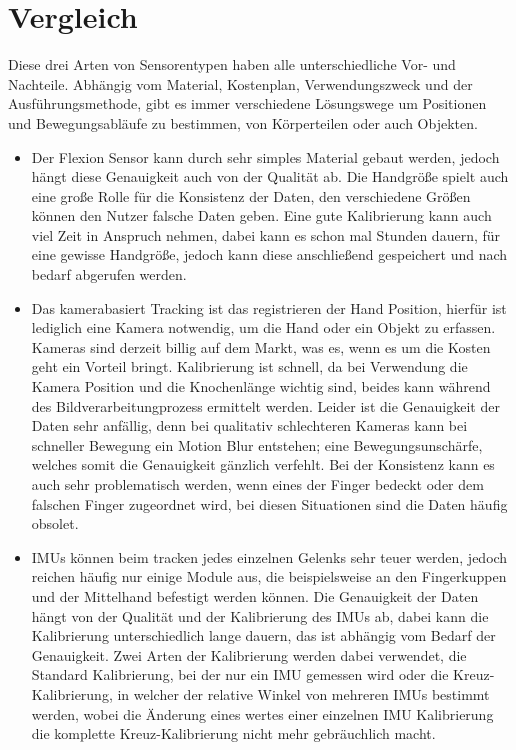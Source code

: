 \section{Vergleich}
Diese drei Arten von Sensorentypen haben alle unterschiedliche Vor- und Nachteile. 
Abhängig vom Material, Kostenplan, Verwendungszweck und der Ausführungsmethode, gibt es immer verschiedene Lösungswege um Positionen und Bewegungsabläufe zu bestimmen, von Körperteilen oder auch Objekten.
\begin{itemize}
    \item Der Flexion Sensor kann durch sehr simples Material gebaut werden, jedoch hängt diese Genauigkeit auch von der Qualität ab. Die Handgröße spielt auch eine große Rolle für die Konsistenz der Daten, den verschiedene Größen können den Nutzer falsche Daten geben. Eine gute Kalibrierung kann auch viel Zeit in Anspruch nehmen, dabei kann es schon mal Stunden dauern, für eine gewisse Handgröße, jedoch kann diese anschließend gespeichert und nach bedarf abgerufen werden.
    
    \item Das kamerabasiert Tracking ist das registrieren der Hand Position, hierfür ist lediglich eine Kamera notwendig, um die Hand oder ein Objekt zu erfassen. Kameras sind derzeit billig auf dem Markt, was es, wenn es um die Kosten geht ein Vorteil bringt. Kalibrierung ist schnell, da bei Verwendung die Kamera Position und die Knochenlänge wichtig sind, beides kann während des Bildverarbeitungprozess ermittelt werden. Leider ist die Genauigkeit der Daten sehr anfällig, denn bei qualitativ schlechteren Kameras kann bei schneller Bewegung ein Motion Blur entstehen; eine Bewegungsunschärfe, welches somit die Genauigkeit gänzlich verfehlt. Bei der Konsistenz kann es auch sehr problematisch werden, wenn eines der Finger bedeckt oder dem falschen Finger zugeordnet wird, bei diesen Situationen sind die Daten häufig obsolet.
    
    \item IMUs können beim tracken jedes einzelnen Gelenks sehr teuer werden, jedoch reichen häufig nur einige Module aus, die beispielsweise an den Fingerkuppen und der Mittelhand befestigt werden können. Die Genauigkeit der Daten hängt von der Qualität und der Kalibrierung des IMUs ab, dabei kann die Kalibrierung unterschiedlich lange dauern, das ist abhängig vom Bedarf der Genauigkeit. Zwei Arten der Kalibrierung werden dabei verwendet, die Standard Kalibrierung, bei der nur ein IMU gemessen wird oder die Kreuz-Kalibrierung, in welcher der relative Winkel von mehreren IMUs bestimmt werden, wobei die Änderung eines wertes einer einzelnen IMU Kalibrierung die komplette Kreuz-Kalibrierung nicht mehr gebräuchlich macht.
\end{itemize}
